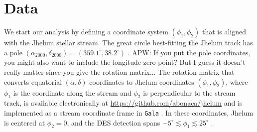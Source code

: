 \documentclass[twocolumn]{aastex62}
\newcommand{\apw}[1]{{\color{blue} APW: #1}}
\begin{document}
%
%


\section{Data}
\label{sec:data}
We start our analysis by defining a coordinate system $(\phi_1,\phi_2)$ that is aligned with the Jhelum stellar stream.
The great circle best-fitting the Jhelum track has a pole $(\alpha_{2000},\delta_{2000}) = (359.1^\circ, 38.2^\circ)$ \citep{shipp2018}.
\apw{If you put the pole coordinates, you might also want to include the longitude zero-point? But I guess it doesn't really matter since you give the rotation matrix...}
The rotation matrix that converts equatorial $(\alpha, \delta)$ coordinates to Jhelum coordinates $(\phi_1, \phi_2)$, where $\phi_1$ is the coordinate along the stream and $\phi_2$ is perpendicular to the stream track, is available electronically at \url{https://github.com/abonaca/jhelum} and is implemented as a stream coordinate frame in \texttt{Gala} \citep{gala}.
In these coordinates, Jhelum is centered at $\phi_2=0$, and the DES detection spans $-5^\circ\lesssim\phi_1\lesssim25^\circ$ \citep{shipp2018}.
\end{document}
